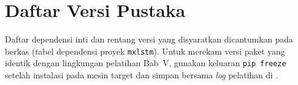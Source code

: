 \section{Daftar Versi Pustaka}
\label{lamp:kode_versi}

Daftar dependensi inti dan rentang versi yang disyaratkan dicantumkan
pada berkas  (tabel dependensi
proyek \texttt{mxlstm}).
Untuk merekam versi paket yang identik dengan lingkungan pelatihan
Bab~V, gunakan
keluaran \texttt{pip freeze} setelah instalasi pada mesin target dan
simpan bersama \emph{log} pelatihan di
.
